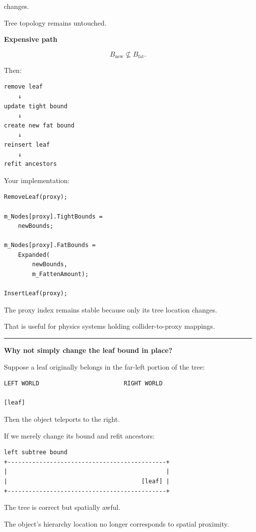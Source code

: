 changes.

Tree topology remains untouched.

\textbf{Expensive path}

\[
B_{\text{new}}\not\subseteq B_{\text{fat}}.
\]

Then:

\begin{verbatim}
remove leaf
    ↓
update tight bound
    ↓
create new fat bound
    ↓
reinsert leaf
    ↓
refit ancestors
\end{verbatim}

Your implementation:

\begin{verbatim}
RemoveLeaf(proxy);

m_Nodes[proxy].TightBounds =
    newBounds;

m_Nodes[proxy].FatBounds =
    Expanded(
        newBounds,
        m_FattenAmount);

InsertLeaf(proxy);
\end{verbatim}

The proxy index remains stable because only its tree location changes.

That is useful for physics systems holding collider-to-proxy mappings.

\begin{center}\rule{0.5\linewidth}{0.5pt}\end{center}

\textbf{Why not simply change the leaf bound in place?}

Suppose a leaf originally belongs in the far-left portion of the tree:

\begin{verbatim}
LEFT WORLD                        RIGHT WORLD

[leaf]
\end{verbatim}

Then the object teleports to the right.

If we merely change its bound and refit ancestors:

\begin{verbatim}
left subtree bound
+---------------------------------------------+
|                                             |
|                                      [leaf] |
+---------------------------------------------+
\end{verbatim}

The tree is correct but spatially awful.

The object's hierarchy location no longer corresponds to spatial proximity.

